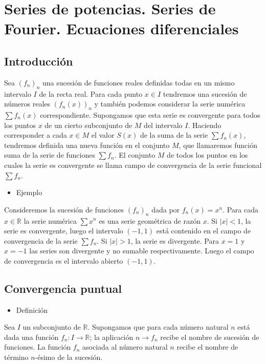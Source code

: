 \section{Series de potencias. Series de Fourier. Ecuaciones diferenciales}
\subsection{Introducción}
Sea $(f_n)_n$ una sucesión de funciones reales definidas todas en un mismo intervalo $I$ de la recta real. Para cada punto $x\in I$ tendremos una sucesión de números reales $(f_n(x))_n$ y también podemos considerar la serie numérica $\sum f_n(x)$ correspondiente. Supongamos que esta serie es convergente para todos los puntos $x$ de un cierto subconjunto de $M$ del intervalo $I$. Haciendo corresponder a cada $x\in M$ el valor $S(x)$ de la suma de la serie $\sum f_n(x)$, tendremos definida una nueva función en el conjunto $M$, que llamaremos función suma de la serie de funciones $\sum f_n$. El conjunto $M$ de todos los puntos en los cuales la serie es convergente se llama campo de convergencia de la serie funcional $\sum f_n$.
\begin{itemize}[label=\color{red}\textbullet, leftmargin=*]
	\item \color{lightblue}Ejemplo
\end{itemize}
Consideremos la sucesión de funciones $(f_n)_n$ dada por $f_n(x)=x^n$. Para cada $x\in\mathbb{R}$ la serie numérica $\sum x^n$ es una serie geométrica de razón $x$. Si $|x|<1$, la serie es convergente, luego el intervalo $(-1,1)$ está contenido en el campo de convergencia de la serie $\sum f_n$. Si $|x|>1$, la serie es divergente. Para $x=1$ y $x=-1$ las series son divergente y no sumable respectivamente. Luego el campo de convergencia es el intervalo abierto $(-1,1)$.
\subsection{Convergencia puntual}
\begin{itemize}[label=\color{red}\textbullet, leftmargin=*]
	\item \color{lightblue}Definición
\end{itemize}
Sea $I$ un subconjunto de $\mathbb{R}$. Supongamos que para cada número natural $n$ está dada una función $f_n:I\rightarrow\mathbb{R}$; la aplicación $n\rightarrow f_n$ recibe el nombre de sucesión de funciones. La función $f_n$ asociada al número natural $n$ recibe el nombre de término $n$-ésimo de la sucesión.

